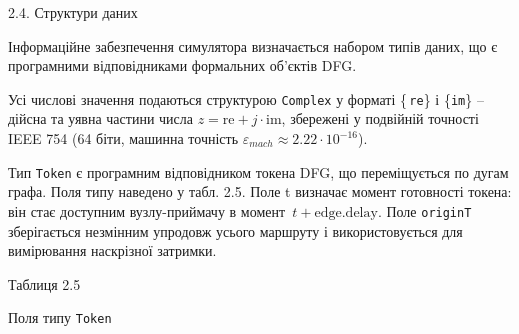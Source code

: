 \documentclass[
]{article}
\newcommand{\passthrough}[1]{#1}
\begin{document}
\protect{}\label{X1a8106e9c6b1210e5d64318a8773dae790c589d}{}2.4.
Структури даних

Інформаційне забезпечення симулятора визначається набором типів даних,
що є програмними відповідниками формальних об'єктів DFG.

Усі числові значення подаються структурою
\passthrough{\lstinline!Complex!} у форматі
\{ \passthrough{\lstinline!re!}\} і \{\passthrough{\lstinline!im!}\} --
дійсна та уявна частини числа \(z = \text{re} + j \cdot \text{im}\),
збережені у подвійній точності IEEE 754 (64 біти, машинна точність
\(\varepsilon_{mach} \approx 2.22 \cdot 10^{- 16}\)).

Тип \passthrough{\lstinline!Token!} є програмним відповідником токена
DFG, що переміщується по дугам графа. Поля типу наведено у табл. 2.5.
Поле t визначає момент готовності токена: він стає доступним
вузлу-приймачу в
момент\passthrough{\lstinline! !}\(t + \text{edge.delay}\). Поле
\passthrough{\lstinline!originT!} зберігається незмінним упродовж усього
маршруту і використовується для вимірювання наскрізної затримки.

Таблиця 2.5

Поля типу \passthrough{\lstinline!Token!}
\end{document}
